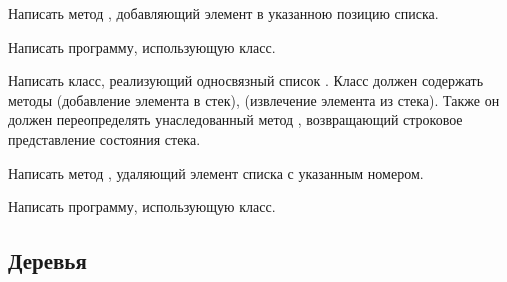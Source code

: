 Написать метод , добавляющий элемент в указанною позицию
списка.

Написать программу, использующую класс.

\task Написать класс, реализующий односвязный список
. Класс должен содержать методы  (добавление элемента
в стек),  (извлечение элемента из стека). Также он должен
переопределять унаследованный метод , возвращающий
строковое представление состояния стека.

Написать метод , удаляющий элемент списка с указанным
номером.

Написать программу, использующую класс.


\subsection{Деревья}

\task

\task

\task

\task

\task

\task

\task

\task

\task

\task

